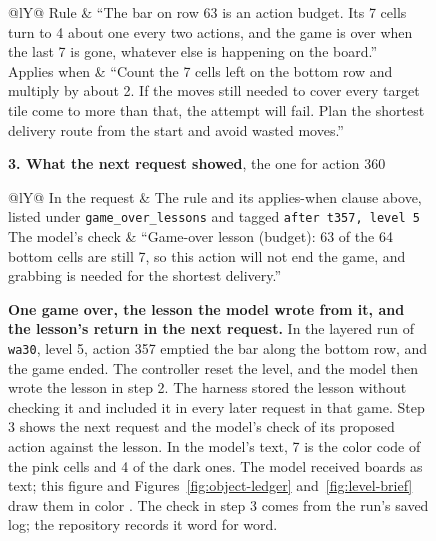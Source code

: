 \begin{figure}[htbp]
\begin{minipage}[t]{0.555\linewidth}
\begin{tabularx}{\linewidth}{@{}lY@{}}\toprule
Rule & ``The bar on row 63 is an action budget. Its 7 cells turn to 4 about one every two actions, and the game is over when the last 7 is gone, whatever else is happening on the board.''\\
Applies when & ``Count the 7 cells left on the bottom row and multiply by about 2. If the moves still needed to cover every target tile come to more than that, the attempt will fail. Plan the shortest delivery route from the start and avoid wasted moves.''\\\bottomrule
\end{tabularx}\par\vspace{7pt}
\textbf{3. What the next request showed}, the one for action 360\par\vspace{2pt}
\begin{tabularx}{\linewidth}{@{}lY@{}}\toprule
In the request & The rule and its applies-when clause above, listed under \texttt{game\_over\_lessons} and tagged \texttt{after t357, level 5}\\
The model's check & ``Game-over lesson (budget): 63 of the 64 bottom cells are still 7, so this action will not end the game, and grabbing is needed for the shortest delivery.''\\\bottomrule
\end{tabularx}
\end{minipage}
\caption{\textbf{One game over, the lesson the model wrote from it, and the lesson's return in the next request.} In the layered run of \texttt{wa30}, level 5, action 357 emptied the bar along the bottom row, and the game ended. The controller reset the level, and the model then wrote the lesson in step 2. The harness stored the lesson without checking it and included it in every later request in that game. Step 3 shows the next request and the model's check of its proposed action against the lesson. In the model's text, 7 is the color code of the pink cells and 4 of the dark ones. The model received boards as text; this figure and Figures~\ref{fig:object-ledger} and~\ref{fig:level-brief} draw them in color \citep{dai2026runfigures}. The check in step 3 comes from the run's saved log; the repository records it word for word.}\label{fig:lesson-game-over}
\end{figure}
